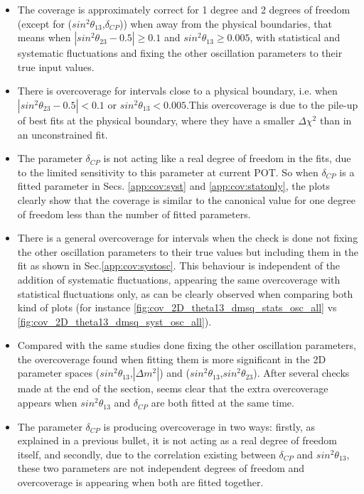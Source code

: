 \begin{itemize}
\item{The coverage is approximately correct for 1 degree and 2 degrees of freedom (except for ($sin^{2}\theta_{13}$,$\delta_{CP}$)) when away from the physical boundaries, that means when $|sin^{2}\theta_{23}-0.5|\geq 0.1$ and $sin^{2}\theta_{13}\geq 0.005$, with statistical and systematic fluctuations and fixing the other oscillation parameters to their true input values.}
\item{There is overcoverage for intervals close to a physical boundary, i.e. when $|sin^{2}\theta_{23}-0.5|<0.1$ or $sin^{2}\theta_{13}<0.005$.This overcoverage is due to the pile-up of best fits at the physical boundary, where they have a smaller $\Delta\chi^{2}$ than in an unconstrained fit.}
\item{The parameter $\delta_{CP}$ is not acting like a real degree of freedom in the fits, due to the limited sensitivity to this parameter at current POT.
So when $\delta_{CP}$ is a fitted parameter in Secs. \ref{app:cov:syst} and \ref{app:cov:statonly}, the plots clearly show that the coverage is similar to the canonical value for one degree of freedom less than the number of fitted parameters.}
\item{There is a general overcoverage for intervals when the check is done not fixing the other oscillation parameters to their true values but including them in the fit as shown in Sec.\ref{app:cov:systosc}. This behaviour is independent of the addition of systematic fluctuations, appearing the same overcoverage with statistical fluctuations only, as can be clearly observed when comparing both kind of plots (for instance \ref{fig:cov_2D_theta13_dmsq_stats_osc_all} vs \ref{fig:cov_2D_theta13_dmsq_syst_osc_all}).} 
\item{Compared with the same studies done fixing the other oscillation parameters, the overcoverage found when fitting them  is more significant in the 2D parameter spaces ($sin^{2}\theta_{13}$,$|\Delta m^{2}|$) and ($sin^{2}\theta_{13}$,$sin^{2}\theta_{23}$). After several checks made at the end of the section, seems clear that the extra overcoverage appears when $sin^{2}\theta_{13}$ and $\delta_{CP}$ are both fitted at the same time.}
\item{The parameter $\delta_{CP}$ is producing overcoverage in two ways: firstly, as explained in a previous bullet, it is not acting as a real degree of freedom itself, and secondly, due to the correlation existing between $\delta_{CP}$ and $sin^{2}\theta_{13}$, these two parameters are not independent degrees of freedom and overcoverage is appearing when both are fitted together.}
\end{itemize}

